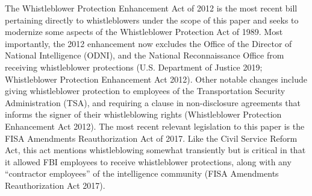 \documentclass [12 pt] {article}
\begin{document}
\bigbreak
The Whistleblower Protection Enhancement Act of 2012 is the most recent bill pertaining directly to whistleblowers under the scope of this paper and seeks to modernize some aspects of the Whistleblower Protection Act of 1989. Most importantly, the 2012 enhancement now excludes the Office of the Director of National Intelligence (ODNI), and the National Reconnaissance Office from receiving whistleblower protections (U.S. Department of Justice 2019; Whistleblower Protection Enhancement Act 2012). Other notable changes include giving whistleblower protection to employees of the Transportation Security Administration (TSA), and requiring a clause in non-disclosure agreements that informs the signer of their whistleblowing rights (Whistleblower Protection Enhancement Act 2012).
\bigbreak
The most recent relevant legislation to this paper is the FISA Amendments Reauthorization Act of 2017. Like the Civil Service Reform Act, this act mentions whistleblowing somewhat transiently but is critical in that it allowed FBI employees to receive whistleblower protections, along with any ``contractor employees'' of the intelligence community (FISA Amendments Reauthorization Act 2017).
\end{document}
